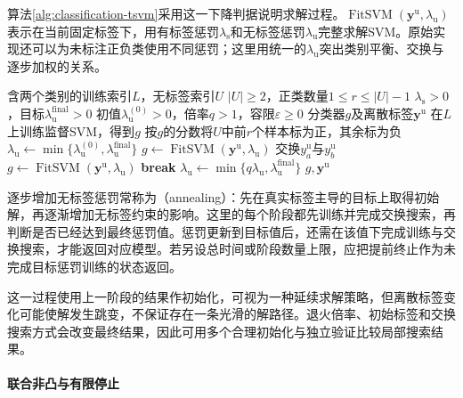 算法\ref{alg:classification-tsvm}采用这一下降判据说明求解过程。$\operatorname{FitSVM}(\bm{y}^{\mathrm{u}},\lambda_{\mathrm{u}})$表示在当前固定标签下，用有标签惩罚$\lambda_{\mathrm{s}}$和无标签惩罚$\lambda_{\mathrm{u}}$完整求解SVM。原始实现还可以为未标注正负类使用不同惩罚；这里用统一的$\lambda_{\mathrm{u}}$突出类别平衡、交换与逐步加权的关系。

\begin{algorithm}[固定类别数量的TSVM逐步加权]
  \label{alg:classification-tsvm}
  \begin{algorithmic}[1]
    \Require 含两个类别的训练索引$L$，无标签索引$U$
    \Require $|U|\geq2$，正类数量$1\leq r\leq|U|-1$
    \Require $\lambda_{\mathrm{s}}>0$，目标$\lambda_{\mathrm{u}}^{\mathrm{final}}>0$
    \Require 初值$\lambda_{\mathrm{u}}^{(0)}>0$，倍率$q>1$，容限$\varepsilon\geq0$
    \Ensure 分类器$g$及离散标签$\bm{y}^{\mathrm{u}}$
    \State 在$L$上训练监督SVM，得到$g$
    \State 按$g$的分数将$U$中前$r$个样本标为正，其余标为负
    \State $\lambda_{\mathrm{u}}\gets
      \min\{\lambda_{\mathrm{u}}^{(0)},\lambda_{\mathrm{u}}^{\mathrm{final}}\}$
      \State $g\gets\operatorname{FitSVM}(\bm{y}^{\mathrm{u}},\lambda_{\mathrm{u}})$
        \State 交换$y_a^{\mathrm{u}}$与$y_b^{\mathrm{u}}$
        \State $g\gets\operatorname{FitSVM}(\bm{y}^{\mathrm{u}},\lambda_{\mathrm{u}})$
      \EndWhile
        \State \textbf{break}
      \EndIf
      \State $\lambda_{\mathrm{u}}\gets
        \min\{q\lambda_{\mathrm{u}},\lambda_{\mathrm{u}}^{\mathrm{final}}\}$
    \EndWhile
    \State \Return $g,\bm{y}^{\mathrm{u}}$
  \end{algorithmic}
\end{algorithm}

逐步增加无标签惩罚常称为（annealing）：先在真实标签主导的目标上取得初始解，再逐渐增加无标签约束的影响。这里的每个阶段都先训练并完成交换搜索，再判断是否已经达到最终惩罚值。惩罚更新到目标值后，还需在该值下完成训练与交换搜索，才能返回对应模型。若另设总时间或阶段数量上限，应把提前终止作为未完成目标惩罚训练的状态返回。

这一过程使用上一阶段的结果作初始化，可视为一种延续求解策略，但离散标签变化可能使解发生跳变，不保证存在一条光滑的解路径。退火倍率、初始标签和交换搜索方式会改变最终结果，因此可用多个合理初始化与独立验证比较局部搜索结果。

\paragraph{联合非凸与有限停止}
\label{sec:classification-tsvm-analysis}

